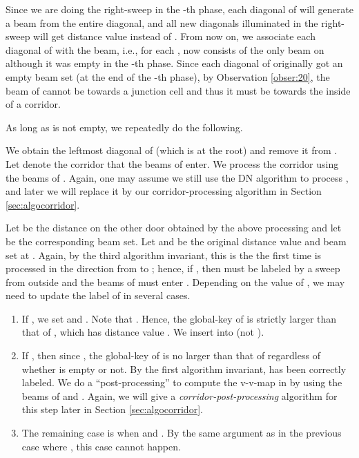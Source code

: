 \documentclass[english,runningheads,11pt]{llncs-revised}
\begin{document}
Since we are doing the right-sweep in the -th phase, each
diagonal of  will generate a beam from the entire diagonal, and
all new diagonals illuminated in the right-sweep will
get distance value  instead of .
From now on, we associate each diagonal of  with the beam, i.e.,
for each ,  now consists of the only beam on  although it was
empty in the -th phase. Since each diagonal of  originally got an empty beam set (at the end of the -th phase), by Observation \ref{obser:20}, the beam of  cannot be towards a junction cell and thus it must be towards the inside of a corridor.

As long as  is not empty, we repeatedly do the following.

We obtain the leftmost diagonal  of  (which is at the root) and remove it from . Let  denote the corridor that the beams of  enter.
We process the corridor  using the beams of .
Again, one may assume we still use the DN algorithm to process ,
and later we will replace it by our corridor-processing
algorithm in Section \ref{sec:algocorridor}.


Let  be the distance on the other door  obtained by the above
processing and let  be the corresponding beam set.
Let  and  be the original distance value and beam set
at .
Again, by the third algorithm invariant, this is the the first
time  is processed in the direction from  to ; hence,
if , then  must be labeled by a sweep from outside 
and the beams of  must enter .
Depending on the value of , we may need to update the label of  in several cases.


\begin{enumerate}
\item
If , we set  and . Note that
. Hence, the global-key of  is strictly larger than that of , which has distance value .
We insert  into  (not ).



\item
If , then since , the global-key of  is no larger than that of  regardless of whether  is empty or not. By the first algorithm invariant,  has been correctly labeled. We do a ``post-processing'' to compute the
v-v-map in  by using the beams of  and . Again, we will give a {\em corridor-post-processing} algorithm for this step later in Section \ref{sec:algocorridor}.




\item
The remaining case is when  and .
By the same argument as in the previous case where
, this case cannot happen.
\end{enumerate}
\end{document}

